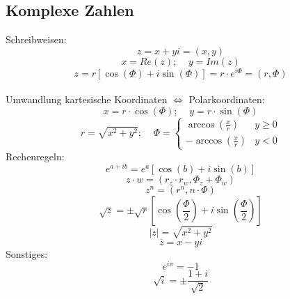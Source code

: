 \documentclass[a4paper,twocolumn,10pt]{article}
\begin{document}
\subsection{Komplexe Zahlen}
Schreibweisen:\\
\begin{equation*}
z=x+yi=(x,y)
\end{equation*}
\begin{equation*}
x=Re(z);\;\;\;\;y=Im(z)
\end{equation*}
\begin{equation*}
z=r[\cos(\Phi)+i\sin(\Phi)]=r\cdot e^{i\Phi}=(r,\Phi)
\end{equation*}
\\Umwandlung kartesische Koordinaten $\Leftrightarrow$ Polarkoordinaten:\\
\begin{equation*}
x=r\cdot \cos(\Phi);\;\;\;\;y=r\cdot\sin(\Phi)
\end{equation*}
\begin{equation*}
r=\sqrt{x^2+y^2};\;\;\;\;\Phi=\begin{cases}\arccos(\frac{x}{r}) & y\geq 0 \\ -\arccos(\frac{x}{r}) & y<0\end{cases}
\end{equation*}
Rechenregeln:\\
\begin{equation*}
e^{a+ib}=e^a[\cos(b)+i\sin(b)]
\end{equation*}
\begin{equation*}
z\cdot w =(r_z\cdot r_w, \Phi_z+\Phi_w)
\end{equation*}
\begin{equation*}
z^n=(r^n,n\cdot \Phi)
\end{equation*}
\begin{equation*}
\sqrt{z}=\pm \sqrt{r}\left[\cos\left(\frac{\Phi}{2}\right)+i\sin\left(\frac{\Phi}{2}\right)\right]
\end{equation*}
\begin{equation*}
|z|=\sqrt{x^2+y^2}
\end{equation*}
\begin{equation*}
\overline{z}=x-yi
\end{equation*}
Sonstiges:\\
\begin{equation*}
e^{i\pi}=-1
\end{equation*}
\begin{equation*}
\sqrt{i}=\pm \frac{1+i}{\sqrt{2}}
\end{equation*}
\end{document}
